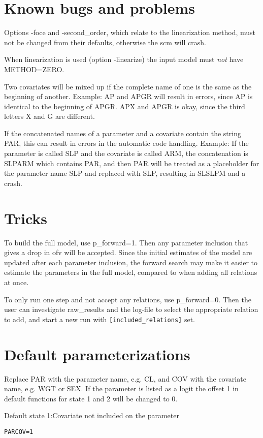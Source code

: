 \section{Known bugs and problems}
Options -foce and -second\_order, which relate to the linearization method,
must not be changed from their defaults, otherwise the scm will crash.

When linearization is used (option -linearize) the input model must \emph{not} 
have METHOD=ZERO.

Two covariates will be mixed up if the complete name of one is the same as the beginning of another. Example: AP and APGR will result in errors, since AP is identical to the beginning of APGR. APX and APGR is okay, since the third letters X and G are different. 

If the concatenated names of a parameter and a covariate contain the string PAR, this can result in errors in the 
automatic code handling. Example: If the parameter is called SLP and the covariate is called ARM, the concatenation
is SLPARM which contains PAR, and then PAR will be treated as a placeholder for the parameter name SLP and
replaced with SLP, resulting in SLSLPM and a crash.
\section{Tricks}
To build the full model, use p\_forward=1. Then any parameter inclusion that gives a drop in ofv will be accepted. Since the initial estimates of the model are updated after each parameter inclusion, the forward search may make it easier to estimate the parameters in the full model, compared to when adding all relations at once.

To only run one step and not accept any relations, use p\_forward=0. Then the user can investigate raw\_results and the log-file to select the appropriate relation to add, and start a new run with 
\verb|[included_relations]| set.

\section{Default parameterizations}
Replace PAR with the parameter name, e.g. CL, and COV with the covariate name, e.g. WGT or SEX.
If the parameter is listed as a logit the offset 1 in default functions for state 1 and 2 will be changed to 0.

Default state 1:Covariate not included on the parameter
\begin{verbatim}
PARCOV=1
\end{verbatim}

